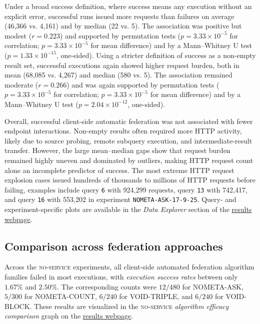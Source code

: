 \documentclass[runningheads]{llncs}
\begin{document}
Under a broad success definition, where success means any execution without an explicit error, successful runs issued more requests than failures on average (46{,}366 vs. 4{,}161) and by median (22 vs. 5). 
The association was positive but modest ($r=0.223$) and supported by permutation tests ($p=3.33\times10^{-5}$ for correlation; $p=3.33\times10^{-5}$ for mean difference) and by a Mann--Whitney U test ($p=1.33\times10^{-15}$, one-sided).
Using a stricter definition of success as a non-empty result set, successful executions again showed higher request burden, both in mean (68{,}085 vs. 4{,}267) and median (580 vs. 5). 
The association remained moderate ($r=0.266$) and was again supported by permutation tests ($p=3.33\times10^{-5}$ for correlation; $p=3.33\times10^{-5}$ for mean difference) and by a Mann--Whitney U test ($p=2.04\times10^{-12}$, one-sided).

Overall, successful client-side automatic federation was not associated with fewer endpoint interactions. 
Non-empty results often required more HTTP activity, likely due to source probing, remote subquery execution, and intermediate-result transfer. 
However, the large mean--median gaps show that request burden remained highly uneven and dominated by outliers, making HTTP request count alone an incomplete predictor of success. 
The most extreme HTTP request explosion cases issued hundreds of thousands to millions of HTTP requests before failing, examples include query \texttt{6} with 924{,}299 requests, query \texttt{13} with 742{,}417, and query \texttt{16} with 553{,}202 in experiment \texttt{NOMETA-ASK-17-9-25}.
Query- and experiment-specific plots are available in the \textit{Data Explorer} section of the \href{https://ecrum19.github.io/fed-survey-results/}{results webpage}.


\subsection{Comparison across federation approaches}\label{sec5.4}
Across the \textsc{no-service} experiments, all client-side automated federation algorithm families failed in most executions, with \emph{execution success rates} between only \(1.67\%\) and \(2.50\%\).
The corresponding counts were \(12/480\) for \textsc{NOMETA-ASK}, \(5/300\) for \textsc{NOMETA-COUNT}, \(6/240\) for \textsc{VOID-TRIPLE}, and \(6/240\) for \textsc{VOID-BLOCK}.
These results are visualized in the \textsc{no-service} \textit{algorithm efficacy comparison} graph on the \href{https://ecrum19.github.io/fed-survey-results/}{results webpage}.
\end{document}
